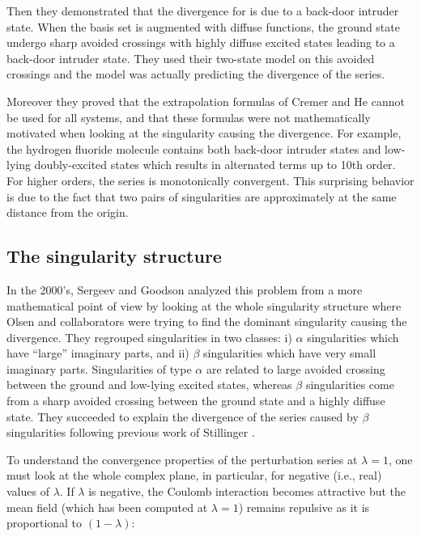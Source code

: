 \documentclass[11pt,a4paper]{article}
\begin{document}
Then they demonstrated that the divergence for  is due to a back-door intruder state. When the basis set is augmented with diffuse functions, the ground state undergo sharp avoided crossings with highly diffuse excited states leading to a back-door intruder state. They used their two-state model on this avoided crossings and the model was actually predicting the divergence of the series. 

Moreover they proved that the extrapolation formulas of Cremer and He \cite{Cremer_1996} cannot be used for all systems, and that these formulas were not mathematically motivated when looking at the singularity causing the divergence. For example, the hydrogen fluoride molecule contains both back-door intruder states and low-lying doubly-excited states which results in alternated terms up to 10th order. For higher orders, the series is monotonically convergent. This surprising behavior is due to the fact that two pairs of singularities are approximately at the same distance from the origin.

\subsection{The singularity structure}

In the 2000's, Sergeev and Goodson \cite{Sergeev_2005, Sergeev_2006} analyzed this problem from a more mathematical point of view by looking at the whole singularity structure where Olsen and collaborators were trying to find the dominant singularity causing the divergence. They regrouped singularities in two classes: i) $\alpha$ singularities which have ``large'' imaginary parts, and ii) $\beta$ singularities which have very small imaginary parts. Singularities of type $\alpha$ are related to large avoided crossing between the ground and low-lying excited states, whereas $\beta$ singularities come from a sharp avoided crossing between the ground state and a highly diffuse state. They succeeded to explain the divergence of the series caused by $\beta$ singularities following previous work of Stillinger \cite{Stillinger_2000}. 

To understand the convergence properties of the perturbation series at $\lambda=1$, one must look at the whole complex plane, in particular, for negative (i.e., real) values of $\lambda$. If $\lambda$ is negative, the Coulomb interaction becomes attractive but the mean field (which has been computed at $\lambda = 1$) remains repulsive as it is proportional to $(1-\lambda)$:
\end{document}

